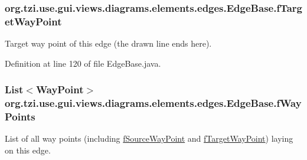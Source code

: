 \hypertarget{classorg_1_1tzi_1_1use_1_1gui_1_1views_1_1diagrams_1_1elements_1_1edges_1_1_edge_base_a5c0d32a028776e7a6a28102ba67b4685}{
\subsubsection[{f\-Target\-Way\-Point}]{ org.\-tzi.\-use.\-gui.\-views.\-diagrams.\-elements.\-edges.\-Edge\-Base.\-f\-Target\-Way\-Point\hspace{0.3cm}{\ttfamily [protected]}}}\label{classorg_1_1tzi_1_1use_1_1gui_1_1views_1_1diagrams_1_1elements_1_1edges_1_1_edge_base_a5c0d32a028776e7a6a28102ba67b4685}
Target way point of this edge (the drawn line ends here). 

Definition at line 120 of file Edge\-Base.\-java.

\hypertarget{classorg_1_1tzi_1_1use_1_1gui_1_1views_1_1diagrams_1_1elements_1_1edges_1_1_edge_base_a759b500d8331a5e61dd9c0d290f3708b}{
\subsubsection[{f\-Way\-Points}]{\setlength{\rightskip}{0pt plus 5cm}List$<${\bf Way\-Point}$>$ org.\-tzi.\-use.\-gui.\-views.\-diagrams.\-elements.\-edges.\-Edge\-Base.\-f\-Way\-Points\hspace{0.3cm}{\ttfamily [protected]}}}\label{classorg_1_1tzi_1_1use_1_1gui_1_1views_1_1diagrams_1_1elements_1_1edges_1_1_edge_base_a759b500d8331a5e61dd9c0d290f3708b}
List of all way points (including \hyperlink{classorg_1_1tzi_1_1use_1_1gui_1_1views_1_1diagrams_1_1elements_1_1edges_1_1_edge_base_ad06179b1e7812b75dd9cdc693fcb0130}{f\-Source\-Way\-Point} and \hyperlink{classorg_1_1tzi_1_1use_1_1gui_1_1views_1_1diagrams_1_1elements_1_1edges_1_1_edge_base_a5c0d32a028776e7a6a28102ba67b4685}{f\-Target\-Way\-Point}) laying on this edge. 

